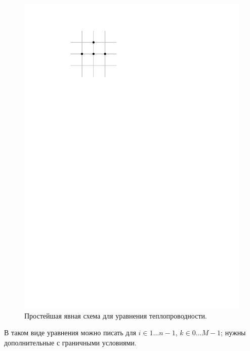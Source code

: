 \documentclass{trlnotes}
\begin{document}
    \begin{figure}[h] \label{fig:therm-simple}
        \begin{center}
            \includegraphics[scale=0.9]{../img/pde/therm-simple.pdf}
        \end{center}
        \caption{Простейшая явная схема для уравнения теплопроводности.}
    \end{figure}

    В таком виде уравнения можно писать для $i \in 1\ldots n-1$, $k\in 0\ldots M-1$; нужны дополнительные с граничными условиями. 
\end{document}
